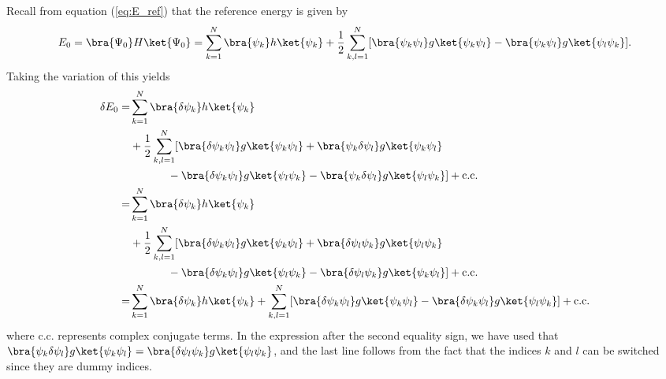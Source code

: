 
Recall from equation (\ref{eq:E_ref}) that the reference energy is given by
\begin{equation}
 E_0 = \bra{\Psi_0}H\ket{\Psi_0} = \sum_{k=1}^N\bra{\psi_k} h\ket{\psi_k} + \frac{1}{2}\sum_{k,l=1}^N[\bra{\psi_k\psi_l}g\ket{\psi_k\psi_l}
                                    - \bra{\psi_k\psi_l}g\ket{\psi_l\psi_k}].
\end{equation}
Taking the variation of this yields
\begin{equation}
\begin{split}
 \delta E_0  = & \sum_{k=1}^N\bra{\delta \psi_k}h\ket{\psi_k} \\
          &   + \frac{1}{2}\sum_{k,l = 1}^N[\bra{\delta \psi_k \psi_l}g\ket{\psi_k \psi_l} + \bra{\psi_k \delta \psi_l}g\ket{\psi_k \psi_l} \\
          &  \hspace{12mm} - \bra{\delta \psi_k \psi_l}g\ket{\psi_l \psi_k} - \bra{\psi_k \delta \psi_l}g\ket{\psi_l \psi_k}] + \text{c.c.}\\
        = & \sum_{k=1}^N\bra{\delta \psi_k}h\ket{\psi_k} \\
          & + \frac{1}{2}\sum_{k,l = 1}^N[\bra{\delta \psi_k \psi_l}g\ket{\psi_k \psi_l} + \bra{\delta\psi_l \psi_k}g\ket{\psi_l \psi_k} \\
          & \hspace{12mm} - \bra{\delta \psi_k \psi_l}g\ket{\psi_l \psi_k} - \bra{\delta\psi_l \psi_k}g\ket{\psi_k \psi_l}] + \text{c.c.}\\
        = & \sum_{k=1}^N\bra{\delta \psi_k}h\ket{\psi_k} + \sum_{k,l = 1}^N[\bra{\delta \psi_k \psi_l}g\ket{\psi_k\psi_l} - \bra{\delta \psi_k \psi_l}g\ket{\psi_l \psi_k}] + \text{c.c.}
\end{split}
\end{equation}
where c.c. represents complex conjugate terms.
In the expression after the second equality sign, we have used that $\bra{\psi_k\delta\psi_l}g\ket{\psi_k\psi_l} = \bra{\delta\psi_l\psi_k}g\ket{\psi_l\psi_k}$, and the last
line follows from the fact that the indices $k$ and $l$ can be switched since they are dummy indices.
